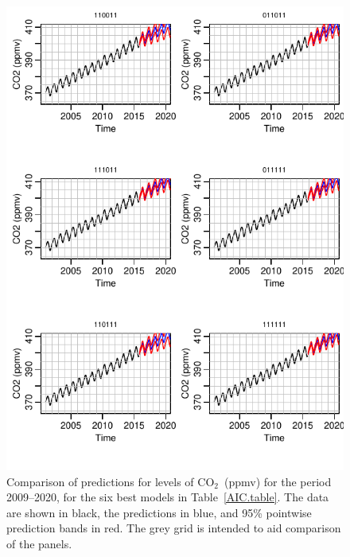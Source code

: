 \documentclass[a4paper,11pt]{article}\usepackage[]{graphicx}\usepackage[]{color}
\makeatletter
\def\maxwidth{ %
  \ifdim\Gin@nat@width>\linewidth
    \linewidth
  \else
    \Gin@nat@width
  \fi
}
\newenvironment{knitrout}{}{} %
\def\CO{{CO$_{2}$}}
\makeatother
\begin{document}
\begin{figure}[p]
\begin{center}
\begin{knitrout}
\color{fgcolor}
\includegraphics[width=\maxwidth]{figure/CO2-predict-1} 

\end{knitrout}
\end{center}
\caption{Comparison of predictions for levels of \CO\  (ppmv) for the period 2009--2020, for the six best models in Table~\ref{AIC.table}.  The data are shown in black, the predictions in blue, and 95\% pointwise prediction bands in red.  The grey grid is intended to aid comparison of the panels.}
\label{pred.fig}
\end{figure}
\end{document}
